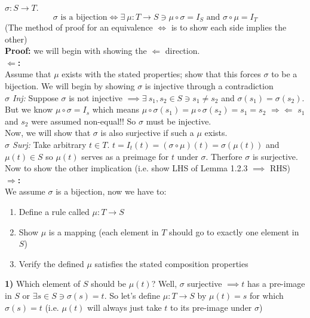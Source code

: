 \begin{lemma}
$\sigma :S \rightarrow T$.
\begin{equation}
    \sigma \text{ is a bijection} \iff \exists \ \mu: T\rightarrow S \ni \mu\circ \sigma = I_S \text{ and } \sigma\circ \mu = I_T\nonumber
\end{equation}
(The method of proof for an equivalence $\Leftrightarrow$ is to show each side implies the other)\steezybreak\\
\textbf{Proof:} we will begin with showing the $\Leftarrow$ direction.\\
\textbf{$\Leftarrow$:} \\Assume that $\mu$ exists with the stated properties; show that this forces $\sigma$ to be a bijection. We will begin by showing $\sigma$ is injective through a contradiction \steezybreak\\
\textit{$\sigma$ Inj:} Suppose $\sigma$ is not injective $\implies \exists \ s_1,s_2\in S \ni s_1\neq s_2$ and $\sigma(s_1)=\sigma(s_2)$. But we know $\mu \circ \sigma = I_s$ which means $\mu\circ \sigma (s_1) = \mu\circ \sigma(s_2) = s_1=s_2$ $\Rightarrow\Leftarrow$ $s_1$ and $s_2$ were assumed non-equal!! So $\sigma$ must be injective.\steezybreak\\
Now, we will show that $\sigma$ is also surjective if such a $\mu$ exists.\steezybreak\\
\textit{$\sigma$ Surj:} Take arbitrary $t\in T$. $t= I_t(t)= (\sigma\circ\mu)(t)=\sigma(\mu(t))$ and $\mu(t)\in S$ so $\mu(t)$ serves as a preimage for $t$ under $\sigma$. Therfore $\sigma$ is surjective. \\ 

\noindent Now to show the other implication (i.e. show LHS of Lemma 1.2.3 $\implies$ RHS) \\
\textbf{$\Rightarrow$:} \\ We assume $\sigma$ is a bijection, now we have to:
\begin{enumerate}
    \item Define a rule called $\mu:T\rightarrow S$
    \item Show $\mu$ is a mapping (each element in $T$ should go to exactly one element in $S$)
    \item Verify the defined $\mu$ satisfies the stated composition properties
\end{enumerate}
\textbf{1)} Which element of $S$ should be $\mu(t)$? Well, $\sigma$ surjective $\implies t$ has a pre-image in $S$ or $\exists s\in S \ni \sigma(s)=t$. So let's define $ \mu: T\rightarrow S$ by $\mu(t)=s$ for which $\sigma(s)=t$ (i.e. $\mu(t)$ will always just take $t$ to its pre-image under $\sigma$)\steezybreak\\


\end{lemma}

